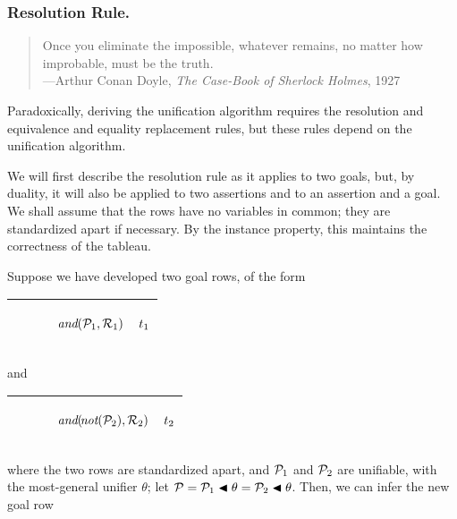 \documentclass[runningheads]{llncs}
\DeclareMathOperator{\uand}{\emph{and}\,}
\DeclareMathOperator{\unot}{\emph{not}\kern-.0pt}
\begin{document}
  \subsubsection{Resolution Rule.} 
 \begin{quote}
 Once you eliminate the impossible, whatever remains, no matter how improbable, must be the truth.
 \\---Arthur Conan Doyle, \emph{The Case-Book of Sherlock Holmes}, 1927
 \end{quote}

 Paradoxically, deriving the unification algorithm requires the resolution and equivalence and equality replacement rules, but these rules depend on the unification algorithm.
 
 We will first describe the resolution rule as it applies to two goals, but, by duality, it will also be applied to two assertions and to an assertion and a goal. We shall assume that the rows have no variables in common;  they are standardized apart if necessary.  By the instance property, this maintains the correctness of the tableau.



 Suppose we have developed two goal rows, of the form

   \begin{center}
\begin{tabular} {T}
\hline
    $\qquad$ & \begin{center}$\uand\!(\expsub{\mathcal{P}}{1},\expsub{\mathcal{R}}{1})$\end{center} & \begin{center}${t}_{1}$\end{center} \\
  \hline
\end{tabular}
\end{center}
\noindent and
  \begin{center}
\begin{tabular} {T}
\hline
    $\qquad$ &  \begin{center}$ \uand\!(\!\unot(\expsub{\mathcal{P}}{2}),\expsub{\mathcal{R}}{2})$\end{center} &  \begin{center}${t}_{2}$\end{center} \\
  \hline
\end{tabular}
 \end{center}

 
\noindent where the two rows are standardized apart, and ${\mathcal{P}}_{1}$ and ${\mathcal{P}}_{2}$ are unifiable, with the most-general unifier $\theta$; let $ \mathcal{P} = {\mathcal{P}}_{1} \blacktriangleleft \theta = {\mathcal{P}}_{2} \blacktriangleleft \theta$.  Then, we can infer the new goal row
\end{document}
